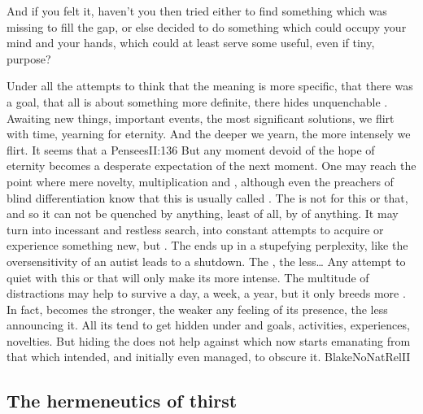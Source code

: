 And if you felt it, haven't you then tried either to find something 
which  was missing to fill the gap, or else decided to 
do something which could occupy your mind and your hands, which could 
at least serve some useful, even if tiny, purpose? 

\pa Under all the attempts to think that the meaning is more specific, that
there was a goal, that all is about something more definite, there hides
unquenchable .  Awaiting new things, important events, the most
significant solutions, we flirt with time, yearning for eternity. And the deeper
we yearn, the more intensely we flirt. It seems that a \citet{mere trifle
  consoles us, for a mere trifle distresses us.}{Pensees}{II:136} But any moment
devoid of the hope of eternity becomes a desperate expectation of the next
moment. One may reach the point where mere novelty, multiplication and
, although even the preachers of
blind differentiation know that
this is usually called .  The  is not for this or that,
and so it can not be quenched by anything, least of all, by  of
anything.  It may turn into incessant and restless search, into constant
attempts to acquire  or experience something new, but . The  ends up in a stupefying perplexity, like the
oversensitivity of an autist leads to a shutdown. The , the less\ldots
Any attempt to quiet  with this or that will only make its  more
intense.  The multitude of distractions may help to survive a day, a week, a
year, but it only breeds more . In fact,  becomes the
stronger, the weaker any feeling of its presence, the less 
announcing it.
All its  tend to get hidden under  and 
goals, activities, experiences, novelties. But hiding the  does not
help against  which now starts emanating from that which intended,
and initially even managed, to obscure it.  \citet{More!  More!  is the cry of a
  mistaken soul, less than All cannot satisfy Man.}{BlakeNoNatRel}{II}
\newpage
\subsection{The hermeneutics of thirst}\label{sub:spiral}

